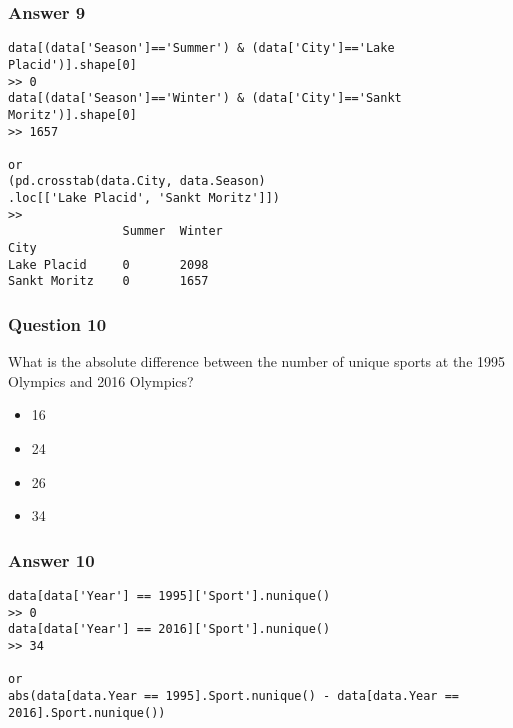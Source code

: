 \begin{frame}[fragile]\frametitle{Answer 9}
\begin{lstlisting}
data[(data['Season']=='Summer') & (data['City']=='Lake Placid')].shape[0]
>> 0
data[(data['Season']=='Winter') & (data['City']=='Sankt Moritz')].shape[0]
>> 1657

or 
(pd.crosstab(data.City, data.Season)
.loc[['Lake Placid', 'Sankt Moritz']])
>>
				Summer	Winter
City		
Lake Placid		0		2098
Sankt Moritz	0		1657
\end{lstlisting}

\end{frame}

\begin{frame}[fragile]\frametitle{Question 10}	
What is the absolute difference between the number of unique sports at the 1995 Olympics and 2016 Olympics?
\begin{itemize}
\item 16
\item 24
\item 26
\item 34
\end{itemize}

\end{frame}

\begin{frame}[fragile]\frametitle{Answer 10}
\begin{lstlisting}
data[data['Year'] == 1995]['Sport'].nunique()
>> 0
data[data['Year'] == 2016]['Sport'].nunique()
>> 34

or
abs(data[data.Year == 1995].Sport.nunique() - data[data.Year == 2016].Sport.nunique())
\end{lstlisting}

\end{frame}